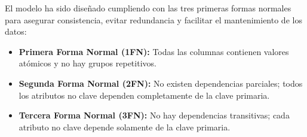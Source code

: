 El modelo ha sido diseñado cumpliendo con las tres primeras formas normales para asegurar consistencia, evitar redundancia y facilitar el mantenimiento de los datos:

\begin{itemize}[label=--]
    \item \textbf{Primera Forma Normal (1FN):} Todas las columnas contienen valores atómicos y no hay grupos repetitivos.
    \item \textbf{Segunda Forma Normal (2FN):} No existen dependencias parciales; todos los atributos no clave dependen completamente de la clave primaria.
    \item \textbf{Tercera Forma Normal (3FN):} No hay dependencias transitivas; cada atributo no clave depende solamente de la clave primaria.
\end{itemize}

